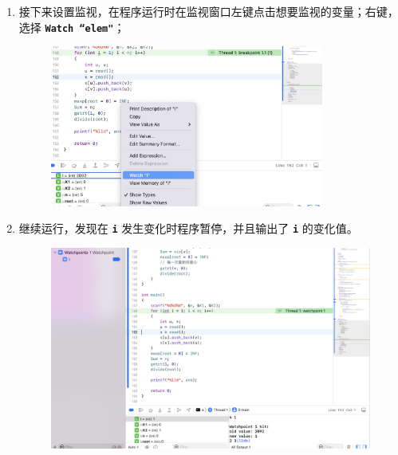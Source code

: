 \documentclass[UTF8, 12pt, a4paper, oneside]{ctexart}
\begin{document}
\begin{enumerate}
\begin{enumerate}
\begin{figure}[h]
                    \end{figure}
                    \newpage
                \item 接下来设置监视，在程序运行时在监视窗口左键点击想要监视的变量；右键，选择 \texttt{\bf Watch ``elem"}；
                    \begin{figure}[h]
                        \centering
                        \includegraphics[width=0.85\textwidth]{step5.png}
                    \end{figure}
                    \newpage
                \item 继续运行，发现在 \texttt{\bf i} 发生变化时程序暂停，并且输出了 \texttt{\bf i} 的变化值。
                    \begin{figure}[h]
                        \centering
                        \includegraphics[width=1\textwidth]{step6.png}
                    \end{figure}
            \end{enumerate}
    \end{enumerate}
\end{document}
